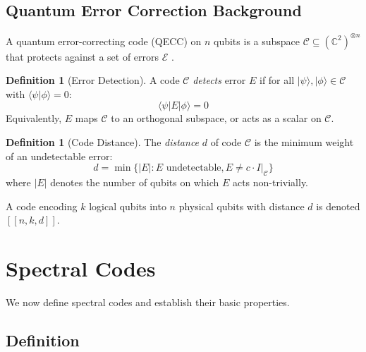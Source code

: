 \documentclass[11pt,a4paper]{article}
\theoremstyle{definition}
\newtheorem{definition}[theorem]{Definition}
\newcommand{\C}{\mathbb{C}}
\newcommand{\codespace}{\mathcal{C}}
\newcommand{\ket}[1]{|#1\rangle}
\newcommand{\bra}[1]{\langle#1|}
\newcommand{\braket}[2]{\langle#1|#2\rangle}
\begin{document}
\subsection{Quantum Error Correction Background}

A quantum error-correcting code (QECC) on $n$ qubits is a subspace $\codespace \subseteq (\C^2)^{\otimes n}$ that protects against a set of errors $\mathcal{E}$ \cite{nielsen2000quantum}.

\begin{definition}[Error Detection]
A code $\codespace$ \emph{detects} error $E$ if for all $\ket{\psi}, \ket{\phi} \in \codespace$ with $\braket{\psi}{\phi} = 0$:
\begin{equation}
    \bra{\psi} E \ket{\phi} = 0
\end{equation}
Equivalently, $E$ maps $\codespace$ to an orthogonal subspace, or acts as a scalar on $\codespace$.
\end{definition}

\begin{definition}[Code Distance]
The \emph{distance} $d$ of code $\codespace$ is the minimum weight of an undetectable error:
\begin{equation}
    d = \min\{|E| : E \text{ undetectable}, E \neq c \cdot I|_\codespace\}
\end{equation}
where $|E|$ denotes the number of qubits on which $E$ acts non-trivially.
\end{definition}

A code encoding $k$ logical qubits into $n$ physical qubits with distance $d$ is denoted $[[n, k, d]]$.

\section{Spectral Codes}
\label{sec:spectral_codes}

We now define spectral codes and establish their basic properties.

\subsection{Definition}
\end{document}
